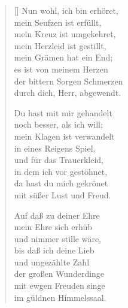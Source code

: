 \begin{multicols}{2}
\begin{verse}[\versewidth]
 Nun wohl, ich bin erhöret,\\
mein Seufzen ist erfüllt,\\
mein Kreuz ist umgekehret,\\
mein Herzleid ist gestillt,\\
mein Grämen hat ein End;\\
es ist von meinem Herzen\\
der bittern Sorgen Schmerzen\\
durch dich, Herr, abgewendt.

 Du hast mit mir gehandelt\\
noch besser, als ich will;\\
mein Klagen ist verwandelt\\
in eines Reigens Spiel,\\
und für das Trauerkleid,\\
in dem ich vor gestöhnet,\\
da hast du mich gekrönet\\
mit süßer Lust und Freud.

 Auf daß zu deiner Ehre\\
mein Ehre sich erhüb\\
und nimmer stille wäre,\\
bis daß ich deine Lieb\\
und ungezählte Zahl\\
der großen Wunderdinge\\
mit ewgen Freuden singe\\
im güldnen Himmelssaal.

\end{verse}
\end{multicols}
